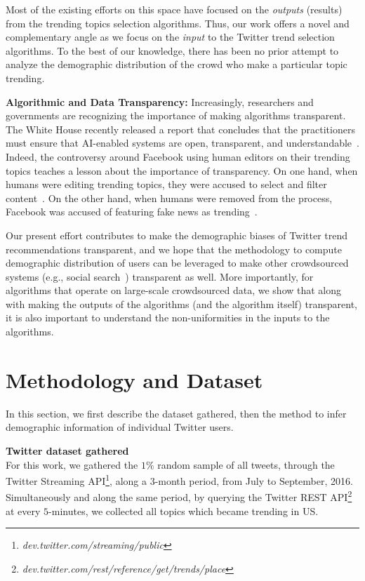 \documentclass[letterpaper]{article}
\begin{document}
Most of the existing efforts on this space have focused on the {\it outputs} (results) from the trending topics selection algorithms.
Thus, our work offers a novel and complementary angle as we focus on the {\it input} 
to the Twitter trend selection algorithms.
To the best of our knowledge, there has been no prior attempt to 
analyze the demographic distribution of the crowd who make a particular topic trending.

\vspace{1mm}
\noindent \textbf{Algorithmic and Data Transparency: }
Increasingly, researchers and governments are recognizing the importance of making algorithms transparent.
The White House recently released a report that concludes that the practitioners must ensure that AI-enabled
systems are open, transparent, and understandable~\cite{white_house_transparency}.
Indeed, the controversy around Facebook using human editors
on their trending topics teaches a lesson about the
importance of transparency. On one hand, when humans were editing trending topics,
they were accused to select and filter content~\cite{facebook_bias}.
On the other hand, when humans were removed from the process,
Facebook was accused of featuring fake news as trending~\cite{Ohlheiser2016}.

Our present effort contributes to make the demographic biases of Twitter 
trend recommendations transparent, and we hope that the methodology
to compute demographic distribution of users can be leveraged to make
other crowdsourced systems (e.g., social search~\cite{Kulshrestha2017}) 
transparent as well. More importantly, for algorithms that operate on 
large-scale crowdsourced data, we show that along
with making the outputs of the algorithms (and the algorithm itself) transparent,
it is also important to understand the non-uniformities in the inputs to the algorithms.

\section{Methodology and Dataset}
\label{sec:method}
\noindent
In this section, we first describe the dataset gathered, then the method to
infer demographic information of individual Twitter users.

\vspace{1mm}
\noindent \textbf{Twitter dataset gathered} \\
\noindent For this work, we gathered the $1\%$ random sample of all tweets, 
through the Twitter Streaming API\footnote{\it dev.twitter.com/streaming/public}, 
along a $3$-month period, from July to September, 2016. Simultaneously and along the same period, 
by querying the Twitter REST API\footnote{\it dev.twitter.com/rest/reference/get/trends/place} 
at every $5$-minutes, we collected all topics which became trending in US.
\end{document}
